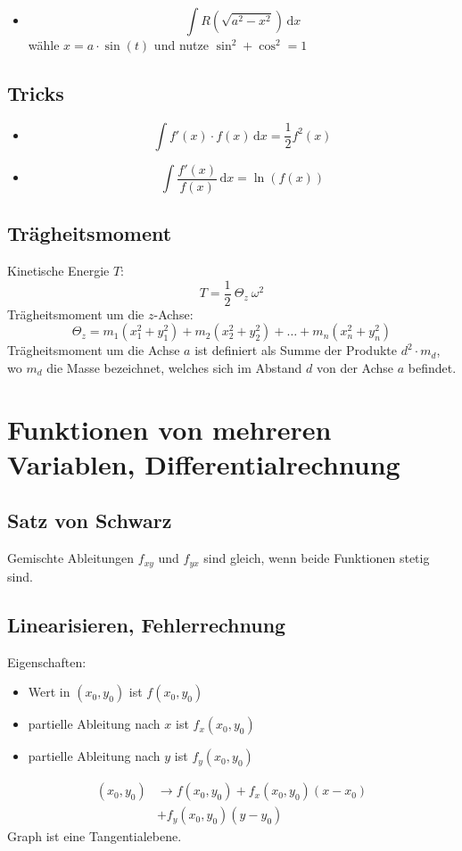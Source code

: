 \documentclass[12pt]{article}
\newcommand{\ud}{\,\mathrm{d}}
\begin{document}
\begin{multicols*}{3}
\begin{itemize}
						\item \[
							\int R(\sqrt{a^2 - x^2}) \ud x
						\]
						wähle $x = a \cdot \sin(t)$ und nutze $\sin^2 + \cos^2 = 1$
					\end{itemize}
			
			\subsection{Tricks} %
				\begin{itemize}
					\item \[
						\int f'(x) \cdot f(x) \ud x = \frac{1}{2} f^2(x)
					\]
					
					\item \[
						\int \frac{f'(x)}{f(x)} \ud x = \ln(f(x))
					\]
				\end{itemize}
			\subsection{Trägheitsmoment} %
				Kinetische Energie $T$:
				\[
					T = \frac{1}{2} \ \Theta_z \ \omega^2
				\]
				Trägheitsmoment um die $z$-Achse:
				\[
					\Theta_z = m_1 (x_1^2 + y_1^2) + m_2 (x_2^2 + y_2^2) + \dots + m_n (x_n^2 + y_n^2)
				\]
				Trägheitsmoment um die Achse $a$ ist definiert als Summe der Produkte $d^2 \cdot m_d$, wo $m_d$ die Masse bezeichnet, welches sich im Abstand $d$ von der Achse $a$ befindet.
		\section{Funktionen von mehreren Variablen, Differentialrechnung} %
			\subsection{Satz von Schwarz} %
				Gemischte Ableitungen $f_{xy}$ und $f_{yx}$ sind gleich, wenn beide Funktionen stetig sind.
			\subsection{Linearisieren, Fehlerrechnung} %
				Eigenschaften:
				\begin{itemize}
					\item Wert in $(x_0, y_0)$ ist $f(x_0, y_0)$
					\item partielle Ableitung nach $x$ ist $f_x (x_0, y_0)$
					\item partielle Ableitung nach $y$ ist $f_y (x_0, y_0)$
				\end{itemize}
				\begin{align*}
					(x_0, y_0) &\rightarrow f(x_0,y_0) + f_x(x_0,y_0)(x-x_0) \\
					&+ f_y (x_0, y_0) (y-y_0)
				\end{align*}
				Graph ist eine Tangentialebene.

\end{multicols*}
\end{document}
